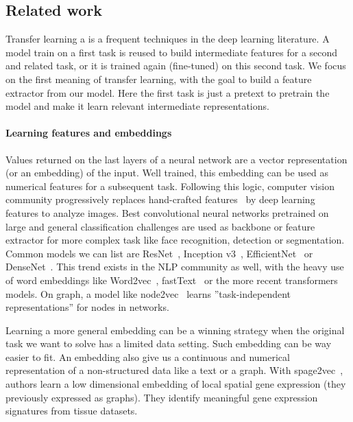 \subsection{Related work} \label{subsec:related_work_learned_features}

Transfer learning a is a frequent techniques in the deep learning literature.
A model train on a first task is reused to build intermediate features for a second and related task, or it is trained again (fine-tuned) on this second task.
We focus on the first meaning of transfer learning, with the goal to build a feature extractor from our model.
Here the first task is just a pretext to pretrain the model and make it learn relevant intermediate representations.

\paragraph{Learning features and embeddings}

Values returned on the last layers of a neural network are a vector representation (or an embedding) of the input.
Well trained, this embedding can be used as numerical features for a subsequent task.
Following this logic, computer vision community progressively replaces hand-crafted features~\cite{Lowe_1999,Bay_2006} by deep learning features to analyze images.
Best convolutional neural networks pretrained on large and general classification challenges are used as backbone or feature extractor for more complex task like face recognition, detection or segmentation.
Common models we can list are ResNet~\cite{He_2016_CVPR}, Inception v3~\cite{Szegedy_2016_CVPR}, EfficientNet~\cite{Tan_2019} or DenseNet~\cite{Huang_2017_CVPR}.
This trend exists in the \ac{NLP} community as well, with the heavy use of word embeddings like Word2vec~\cite{Mikolov_2013}, fastText~\cite{Joulin_2016} or the more recent transformers models.
On graph, a model like node2vec~\cite{Grover_2016} learns ''task-independent representations'' for nodes in networks.

Learning a more general embedding can be a winning strategy when the original task we want to solve has a limited data setting.
Such embedding can be way easier to fit.
An embedding also give us a continuous and numerical representation of a non-structured data like a text or a graph.
With spage2vec~\cite{Partel_2021}, authors learn a low dimensional embedding of local spatial gene expression (they previously expressed as graphs).
They identify meaningful gene expression signatures from tissue datasets.

